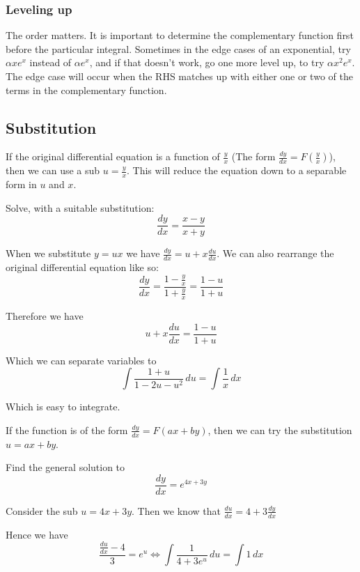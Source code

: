 \documentclass{article}
\newcommand{\f}[2]{\frac{#1}{#2}}
\newcommand{\dd}[2]{\frac{d #1}{d #2}}
\newcommand{\intg}[2]{\int #1 \, d#2}
\theoremstyle{mytheoremstyle}
\theoremstyle{mytheoremstyle}
\theoremstyle{myproblemstyle}
\theoremstyle{myproblemstyle}
\begin{document}
    \subsubsection{Leveling up}
    The order matters. It is important to determine the complementary function first before the particular integral. Sometimes in the edge cases of an exponential, try $\alpha x e^x$ instead of $\alpha e^x$, and if that doesn't work, go one more level up, to try $\alpha x^2 e^x$. The edge case will occur when the RHS matches up with either one or two of the terms in the complementary function.


    \subsection{Substitution}
    If the original differential equation is a function of $\f{y}{x}$ (The form $\dd{y}{x} = F(\f{y}{x})$), then we can use a sub $u = \f{y}{x}$. This will reduce the equation down to a separable form in $u$ and $x$. 

    \begin{example}
        Solve, with a suitable substitution: \[\dd{y}{x} = \f{x - y}{x + y}\]
    \end{example}

    When we substitute $y = ux$ we have $\dd{y}{x} = u + x\dd{u}{x}$. We can also rearrange the original differential equation like so:
    \[\dd{y}{x} = \f{1 - \f{y}{x}}{1 + \f{y}{x}} = \f{1-u}{1+u}\]

    Therefore we have \[u + x\dd{u}{x} = \f{1-u}{1+u}\]

    Which we can separate variables to \[\intg{\f{1+ u}{1 - 2u - u^2}}{u} = \intg{\f{1}{x}}{x}\]

    Which is easy to integrate.

    \vspace{5pt}

    If the function is of the form $\dd{y}{x} = F(ax + by)$, then we can try the substitution $u = ax + by$. 

    \begin{example}
        Find the general solution to \[\dd{y}{x} = e^{4x + 3y}\]
    \end{example}

    Consider the sub $u = 4x + 3y$. Then we know that $\dd{u}{x} = 4 + 3\dd{y}{x}$

    Hence we have \[\frac{\dd{u}{x} - 4}{3} = e^u \iff \intg{\f{1}{4 + 3e^u}}{u} = \intg{1}{x}\]
\end{document}
